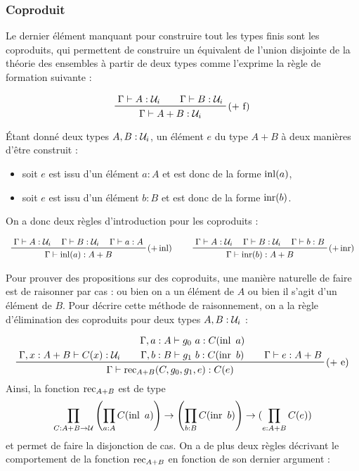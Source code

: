\documentclass[../../rapport.tex]{subfiles}
\begin{document}
  \subsubsection{Coproduit}

  Le dernier élément manquant pour construire tout les types finis sont les coproduits,
  qui permettent de construire un équivalent de l'union disjointe de la théorie des ensembles à partir de deux types
  comme l'exprime la règle de formation suivante :

  $$
  \prfinterspace=2em
  \prftree[r]{($+$ f)}{\Gamma \vdash A : \U_i}{\Gamma \vdash B : \U_i}
    {\Gamma \vdash A + B : \U_i}
  $$

  Étant donné deux types $A, B : \mathcal U_i$, un élément $e$ du type $A + B$ à deux manières d'être construit :
  \begin{itemize}
    \item soit $e$ est issu d'un élément $a : A$ et est donc de la forme $\operatorname{inl}(a)$,
    \item soit $e$ est issu d'un élément $b : B$ et est donc de la forme $\operatorname{inr}(b)$.
  \end{itemize}
  On a donc deux règles d'introduction pour les coproduits :

  $$
  \prfinterspace=1.2em
  \begin{array}{cc}
    \prftree[r]{($+ \inl)$}{\Gamma \vdash A : \U_i}{\Gamma \vdash B : \U_i}{\Gamma \vdash a : A}{\Gamma \vdash \inl(a) : A + B} \hspace{0.5cm}
    & \prftree[r]{($+ \inr)$}{\Gamma \vdash A : \U_i}{\Gamma \vdash B : \U_i}{\Gamma \vdash b : B}{\Gamma \vdash \inr(b) : A + B}
  \end{array}
  $$

  Pour prouver des propositions sur des coproduits, une manière naturelle de faire est de raisonner par cas :
  ou bien on a un élément de $A$ ou bien il s'agit d'un élément de $B$.
  Pour décrire cette méthode de raisonnement, on a la règle d'élimination des coproduits pour deux types $A, B : \mathcal U_i$ :

  $$
  \prfinterspace=2em
  \prftree[r]{($+$ e)}
    {\Gamma, x : A+B \vdash C(x) : \U_i}
    {\prfStackPremises
      {\Gamma, a : A \vdash g_0\ a : C(\inl\ a)}
      {\Gamma, b : B \vdash g_1\ b : C(\inr\ b)}}
    {\Gamma \vdash e : A + B}
  {\Gamma \vdash \rec_{A+B}(C, g_0, g_1, e) : C(e)}
  $$
  Ainsi, la fonction $\operatorname{rec}_{A+B}$ est de type %
  $$\prod_{C : A+B \fun \U}\left(\prod_{a : A}C(\inl\ a)\right) \fun \left(\prod_{b : B}C(\inr\ b)\right) \fun (\prod_{e:A+B}C(e))$$
  et permet de faire la disjonction de cas.
  On a de plus deux règles décrivant le comportement de la fonction $\operatorname{rec}_{A+B}$ en fonction de son dernier argument :
\end{document}
